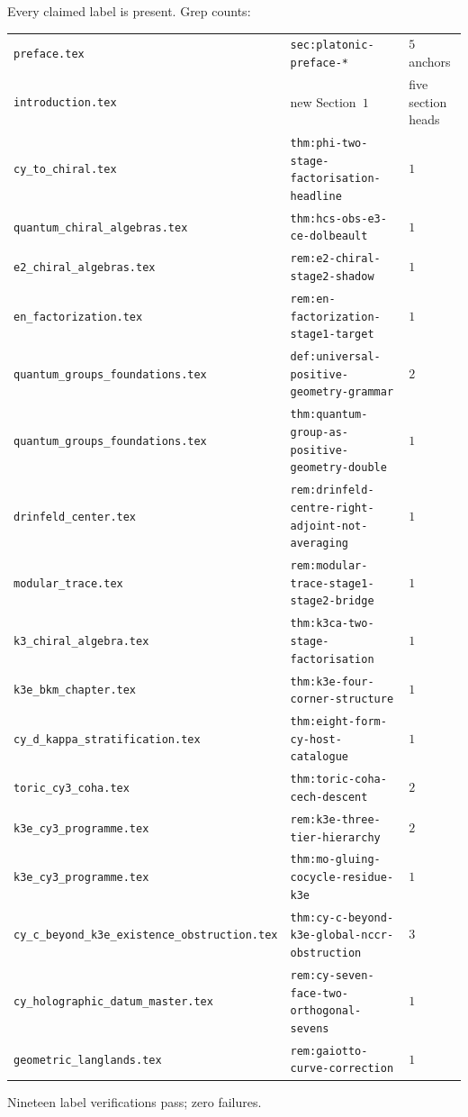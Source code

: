 \documentclass[11pt]{article}
\begin{document}
Every claimed label is present. Grep counts:
\begin{center}
\begin{tabular}{lll}
 \texttt{preface.tex} & \texttt{sec:platonic-preface-*} & $5$ anchors \\
 \texttt{introduction.tex} & new Section~$1$ & five section heads \\
 \texttt{cy\_to\_chiral.tex} & \texttt{thm:phi-two-stage-factorisation-headline} & $1$ \\
 \texttt{quantum\_chiral\_algebras.tex} & \texttt{thm:hcs-obs-e3-ce-dolbeault} & $1$ \\
 \texttt{e2\_chiral\_algebras.tex} & \texttt{rem:e2-chiral-stage2-shadow} & $1$ \\
 \texttt{en\_factorization.tex} & \texttt{rem:en-factorization-stage1-target} & $1$ \\
 \texttt{quantum\_groups\_foundations.tex} & \texttt{def:universal-positive-geometry-grammar} & $2$ \\
 \texttt{quantum\_groups\_foundations.tex} & \texttt{thm:quantum-group-as-positive-geometry-double} & $1$ \\
 \texttt{drinfeld\_center.tex} & \texttt{rem:drinfeld-centre-right-adjoint-not-averaging} & $1$ \\
 \texttt{modular\_trace.tex} & \texttt{rem:modular-trace-stage1-stage2-bridge} & $1$ \\
 \texttt{k3\_chiral\_algebra.tex} & \texttt{thm:k3ca-two-stage-factorisation} & $1$ \\
 \texttt{k3e\_bkm\_chapter.tex} & \texttt{thm:k3e-four-corner-structure} & $1$ \\
 \texttt{cy\_d\_kappa\_stratification.tex} & \texttt{thm:eight-form-cy-host-catalogue} & $1$ \\
 \texttt{toric\_cy3\_coha.tex} & \texttt{thm:toric-coha-cech-descent} & $2$ \\
 \texttt{k3e\_cy3\_programme.tex} & \texttt{rem:k3e-three-tier-hierarchy} & $2$ \\
 \texttt{k3e\_cy3\_programme.tex} & \texttt{thm:mo-gluing-cocycle-residue-k3e} & $1$ \\
 \texttt{cy\_c\_beyond\_k3e\_existence\_obstruction.tex} & \texttt{thm:cy-c-beyond-k3e-global-nccr-obstruction} & $3$ \\
 \texttt{cy\_holographic\_datum\_master.tex} & \texttt{rem:cy-seven-face-two-orthogonal-sevens} & $1$ \\
 \texttt{geometric\_langlands.tex} & \texttt{rem:gaiotto-curve-correction} & $1$ \\
\end{tabular}
\end{center}
Nineteen label verifications pass; zero failures.
\end{document}
